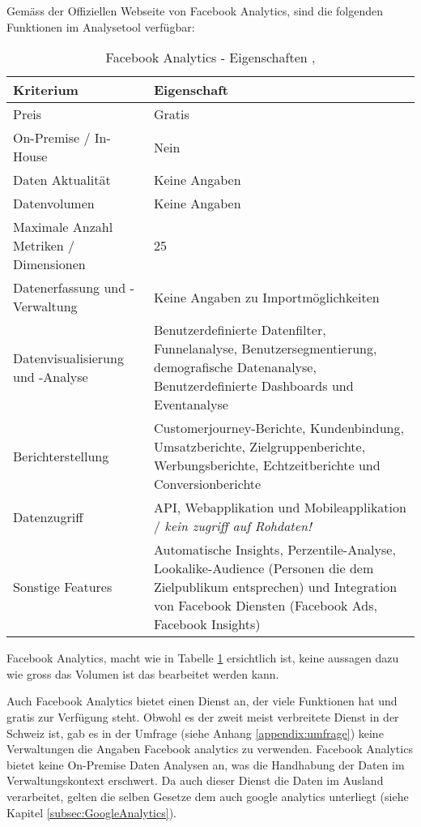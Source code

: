 Gemäss der Offiziellen Webseite von Facebook Analytics, sind die folgenden Funktionen im Analysetool verfügbar:

\begin{table}[h]
	\centering
	\begin{tabular}{ | p{4cm} | p{10cm} |}
		\hline
		\textbf{Kriterium} & \textbf{Eigenschaft}  \\ 
		\hline
    Preis & Gratis \\
    \hline
    On-Premise / In-House & Nein \\
    \hline
    Daten Aktualität & Keine Angaben \\
    \hline
		Datenvolumen & Keine Angaben \\
    \hline
    Maximale Anzahl Metriken / Dimensionen & 25 \\
    \hline
		Datenerfassung und -Verwaltung & Keine Angaben zu Importmöglichkeiten \\
    \hline
    Datenvisualisierung und -Analyse & Benutzerdefinierte Datenfilter, Funnelanalyse, Benutzersegmentierung,  demografische Datenanalyse, Benutzerdefinierte Dashboards und Eventanalyse \\
    \hline
    Berichterstellung & Customerjourney-Berichte, Kundenbindung, Umsatzberichte, Zielgruppenberichte, Werbungsberichte, Echtzeitberichte und Conversionberichte \\
    \hline
    Datenzugriff & API, Webapplikation und Mobileapplikation / \textit{kein zugriff auf Rohdaten!}\\
    \hline
    Sonstige Features & Automatische Insights, Perzentile-Analyse, Lookalike-Audience (Personen die dem Zielpublikum entsprechen) und Integration von Facebook Diensten (Facebook Ads, Facebook Insights) \\
		\hline  
	\end{tabular}
	\caption{Facebook Analytics - Eigenschaften \parencite{facebookAnalyticsFeatures}, \parencite{facebookAnalyticsHelp}}
	\label{tab: facebookAnalyticsFeatures}
\end{table}

Facebook Analytics, macht wie in Tabelle \ref{tab: facebookAnalyticsFeatures} ersichtlich ist, keine aussagen dazu wie gross das Volumen ist das bearbeitet werden kann. 

Auch Facebook Analytics bietet einen Dienst an, der viele Funktionen hat und gratis zur Verfügung steht. Obwohl es der zweit meist verbreitete Dienst in der Schweiz ist, gab es in der Umfrage (siehe Anhang \ref{appendix:umfrage}) keine Verwaltungen die Angaben Facebook analytics zu verwenden. Facebook Analytics bietet keine On-Premise Daten Analysen an, was die Handhabung der Daten im Verwaltungskontext erschwert. Da auch dieser Dienst die Daten im Ausland verarbeitet, gelten die selben Gesetze dem auch google analytics unterliegt (siehe Kapitel \ref{subsec:GoogleAnalytics}). 

